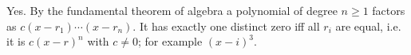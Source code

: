 Yes. By the fundamental theorem of algebra a polynomial of degree $n\ge1$ factors as $c(x-r_1)\cdots(x-r_n)$. It has exactly one distinct zero iff all $r_i$ are equal, i.e. it is $\boxed{c(x-r)^n}$ with $c\ne0$; for example $(x-i)^3$.
